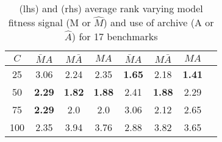 
\begin{table*}[ht]
\centering
\small
\begin{tabular}{ c | c c c ||  c c c c }
 $C$& $\bar M A$ & $M \bar A$ & $MA$ & $\bar M A$ & $M \bar A$ & $MA$\\ \hline
 25 & 3.06 & 2.24 & 2.35 & \textbf{1.65} & 2.18 & \textbf{1.41} \\
 50 & \textbf{2.29} & \textbf{1.82} & \textbf{1.88} & 2.41 & \textbf{1.88} & 2.29 \\
 75 & \textbf{2.29} & 2.0 & 2.0 & 3.06 & 2.12 & 2.65 \\
 100 & 2.35 & 3.94 & 3.76 &2.88 & 3.82 & 3.65  \\
\end{tabular}
\caption{\DRAW (lhs) and \FULL (rhs) average rank varying model fitness signal (M or $\hat M$) and use of archive (A or $\hat A$) for 17 benchmarks}
\label{table:XXdraws_avg_ranks}
\end{table*}

